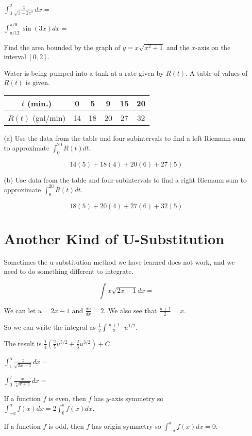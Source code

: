 \documentclass[../bccalc.tex]{subfiles}
\begin{document}
\ex $\int_0^2 \frac{x}{\sqrt{1+2x^2}}dx=$

\ex $\int_{\pi/12}^{\pi/9}\sin(3x)dx=$

\ex Find the area bounded by the graph of $y=x\sqrt{x^2+1}$ and the $x$-axis on the interval $[0,2]$.

\begin{example}
    Water is being pumped into a tank at a rate given by $R(t)$. A table of values of $R(t)$ is given.
    \begin{tabular}{|c|c|c|c|c|c|}
        \hline
        $t$ (min.) & 0 & 5 & 9 & 15 & 20\\ \hline 
        $R(t)$ (gal/min) & 14 & 18 & 20 & 27 & 32\\ \hline
    \end{tabular}

    (a) Use the data from the table and four subintervals to find a left Riemann sum to approximate $\int_0^{20}R(t)dt$.

    \[ 14(5)+18(4)+20(6)+27(5) \]

    (b) Use data from the table and four subintervals to find a right Riemann sum to approximate $\int_0^{20}R(t)dt$.

    \[ 18(5)+20(4)+27(6)+32(5) \]
\end{example}

\section{Another Kind of U-Substitution}
Sometimes the u-substitution method we have learned does not work, and we need to do something different to integrate.

\begin{example}
    \[ \int x\sqrt{2x-1}dx = \]

    We can let $u=2x-1$ and $\frac{du}{dx}=2$. We also see that $\frac{u+1}{2}=x$.

    So we can write the integral as $\frac{1}{2}\int \frac{u+1}{2}\cdot u^{1/2}$.

    The result is $\frac{1}{4}\left(\frac{2}{5}u^{5/2}+\frac{2}{3}u^{3/2}\right)+C$.
\end{example}

\ex $\int_1^5 \frac{x}{\sqrt{2x-1}}dx=$

\ex $\int_0^7 \frac{x}{\sqrt[3]{x+1}}dx=$

If a function $f$ is even, then $f$ has $y$-axis symmetry so $\int_{-a}^a f(x)dx=2\int_0^a f(x)dx$.

If a function $f$ is odd, then $f$ has origin symmetry so $\int_{-a}^a f(x)dx=0$.
\end{document}
